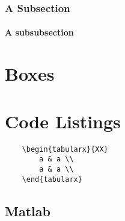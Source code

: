\documentclass[a4paper,11pt,oneside,showtrims]{alpenthesis}
\begin{document}
\subsection{A Subsection}
\lipsum[1]

\subsubsection{A subsubsection}
\lipsum[2]
\chapter{Boxes} %
\tikzexternaldisable
\begin{tcolorbox}[breakable,title=Breakable Box With Title]
    \lipsum[1-9]
\end{tcolorbox}
\tikzexternalenable

\vspace{1em}

\tikzexternaldisable
\begin{tcolorbox}[title=Box with title]
    \lipsum[2]
\end{tcolorbox}
\tikzexternalenable

\vspace{1em}

\tikzexternaldisable
\begin{tcolorbox}
    \lipsum[2]
\end{tcolorbox}
\tikzexternalenable

\chapter{Code Listings} %
\begin{verbatim}
    \begin{tabularx}{XX}
        a & a \\
        a & a \\
    \end{tabularx}
\end{verbatim}

\section{Matlab}
\end{document}
